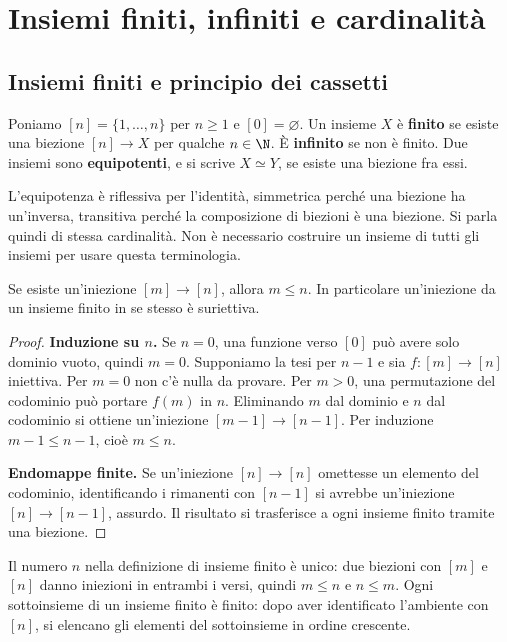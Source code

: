\chapter{Insiemi finiti, infiniti e cardinalità}

\section{Insiemi finiti e principio dei cassetti}
\begin{definizione}
Poniamo $[n]=\{1,\ldots,n\}$ per $n\ge1$ e $[0]=\varnothing$. Un insieme $X$ è \textbf{finito} se esiste una biezione $[n]\to X$ per qualche $n\in\N$. È \textbf{infinito} se non è finito. Due insiemi sono \textbf{equipotenti}, e si scrive $X\simeq Y$, se esiste una biezione fra essi.
\end{definizione}

L'equipotenza è riflessiva per l'identità, simmetrica perché una biezione ha un'inversa, transitiva perché la composizione di biezioni è una biezione. Si parla quindi di stessa cardinalità. Non è necessario costruire un insieme di tutti gli insiemi per usare questa terminologia.

\begin{lemma}\label{lem:cassetti}
Se esiste un'iniezione $[m]\to[n]$, allora $m\le n$. In particolare un'iniezione da un insieme finito in se stesso è suriettiva.
\end{lemma}
\begin{proof}
\textbf{Induzione su $n$.} Se $n=0$, una funzione verso $[0]$ può avere solo dominio vuoto, quindi $m=0$. Supponiamo la tesi per $n-1$ e sia $f:[m]\to[n]$ iniettiva. Per $m=0$ non c'è nulla da provare. Per $m>0$, una permutazione del codominio può portare $f(m)$ in $n$. Eliminando $m$ dal dominio e $n$ dal codominio si ottiene un'iniezione $[m-1]\to[n-1]$. Per induzione $m-1\le n-1$, cioè $m\le n$.

\textbf{Endomappe finite.} Se un'iniezione $[n]\to[n]$ omettesse un elemento del codominio, identificando i rimanenti con $[n-1]$ si avrebbe un'iniezione $[n]\to[n-1]$, assurdo. Il risultato si trasferisce a ogni insieme finito tramite una biezione.
\end{proof}

Il numero $n$ nella definizione di insieme finito è unico: due biezioni con $[m]$ e $[n]$ danno iniezioni in entrambi i versi, quindi $m\le n$ e $n\le m$. Ogni sottoinsieme di un insieme finito è finito: dopo aver identificato l'ambiente con $[n]$, si elencano gli elementi del sottoinsieme in ordine crescente.

